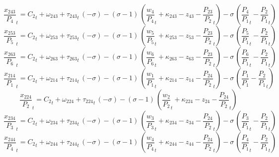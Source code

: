 \begin{dmath}
{{\frac{x_{243}}{P_{4}}}}_{t}={{C_{2}}}_{t}+{{\omega_{243}}}+{{\tau_{243}}}_{t}\, \left(-{{\sigma}}\right)-\left({{\sigma}}-1\right)\, \left({{\frac{w_{4}}{P_{4}}}}_{t}+{{\kappa_{243}}}-{{z_{43}}}-{{\frac{P_{23}}{P_{2}}}}_{t}\right)-{{\sigma}}\, \left({{\frac{P_{4}}{P_{1}}}}_{t}-{{\frac{P_{2}}{P_{1}}}}_{t}\right)
\end{dmath}
\begin{dmath}
{{\frac{x_{253}}{P_{5}}}}_{t}={{C_{2}}}_{t}+{{\omega_{253}}}+{{\tau_{253}}}_{t}\, \left(-{{\sigma}}\right)-\left({{\sigma}}-1\right)\, \left({{\frac{w_{5}}{P_{5}}}}_{t}+{{\kappa_{253}}}-{{z_{53}}}-{{\frac{P_{23}}{P_{2}}}}_{t}\right)-{{\sigma}}\, \left({{\frac{P_{5}}{P_{1}}}}_{t}-{{\frac{P_{2}}{P_{1}}}}_{t}\right)
\end{dmath}
\begin{dmath}
{{\frac{x_{263}}{P_{6}}}}_{t}={{C_{2}}}_{t}+{{\omega_{263}}}+{{\tau_{263}}}_{t}\, \left(-{{\sigma}}\right)-\left({{\sigma}}-1\right)\, \left({{\frac{w_{6}}{P_{6}}}}_{t}+{{\kappa_{263}}}-{{z_{63}}}-{{\frac{P_{23}}{P_{2}}}}_{t}\right)-{{\sigma}}\, \left({{\frac{P_{6}}{P_{1}}}}_{t}-{{\frac{P_{2}}{P_{1}}}}_{t}\right)
\end{dmath}
\begin{dmath}
{{\frac{x_{214}}{P_{1}}}}_{t}={{C_{2}}}_{t}+{{\omega_{214}}}+{{\tau_{214}}}_{t}\, \left(-{{\sigma}}\right)-\left({{\sigma}}-1\right)\, \left({{\frac{w_{1}}{P_{1}}}}_{t}+{{\kappa_{214}}}-{{z_{14}}}-{{\frac{P_{24}}{P_{2}}}}_{t}\right)-{{\sigma}}\, \left({{\frac{P_{1}}{P_{1}}}}-{{\frac{P_{2}}{P_{1}}}}_{t}\right)
\end{dmath}
\begin{dmath}
{{\frac{x_{224}}{P_{2}}}}_{t}={{C_{2}}}_{t}+{{\omega_{224}}}+{{\tau_{224}}}_{t}\, \left(-{{\sigma}}\right)-\left({{\sigma}}-1\right)\, \left({{\frac{w_{2}}{P_{2}}}}_{t}+{{\kappa_{224}}}-{{z_{24}}}-{{\frac{P_{24}}{P_{2}}}}_{t}\right)
\end{dmath}
\begin{dmath}
{{\frac{x_{234}}{P_{3}}}}_{t}={{C_{2}}}_{t}+{{\omega_{234}}}+{{\tau_{234}}}_{t}\, \left(-{{\sigma}}\right)-\left({{\sigma}}-1\right)\, \left({{\frac{w_{3}}{P_{3}}}}_{t}+{{\kappa_{234}}}-{{z_{34}}}-{{\frac{P_{24}}{P_{2}}}}_{t}\right)-{{\sigma}}\, \left({{\frac{P_{3}}{P_{1}}}}_{t}-{{\frac{P_{2}}{P_{1}}}}_{t}\right)
\end{dmath}
\begin{dmath}
{{\frac{x_{244}}{P_{4}}}}_{t}={{C_{2}}}_{t}+{{\omega_{244}}}+{{\tau_{244}}}_{t}\, \left(-{{\sigma}}\right)-\left({{\sigma}}-1\right)\, \left({{\frac{w_{4}}{P_{4}}}}_{t}+{{\kappa_{244}}}-{{z_{44}}}-{{\frac{P_{24}}{P_{2}}}}_{t}\right)-{{\sigma}}\, \left({{\frac{P_{4}}{P_{1}}}}_{t}-{{\frac{P_{2}}{P_{1}}}}_{t}\right)
\end{dmath}

